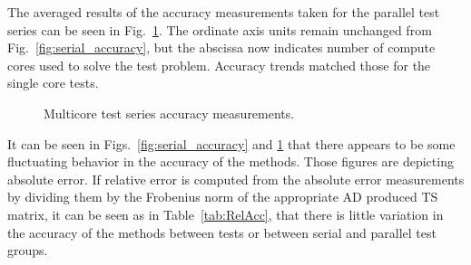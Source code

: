 \documentclass[preprint,12pt]{elsarticle}
\begin{document}
%
The averaged results of the accuracy measurements taken for the parallel test
series can be seen in Fig.~\ref{fig:multi_accuracy}. The ordinate axis units
remain unchanged from Fig.~\ref{fig:serial_accuracy}, but the abscissa now
indicates number of compute cores used to solve the test problem. Accuracy
trends matched those for the single core tests. 
%
\begin{figure}[tbp] \centering
\scalebox{1.0}{} \caption{Multicore test
series accuracy measurements.} \label{fig:multi_accuracy} \end{figure}
%
 It can be seen in Figs.~\ref{fig:serial_accuracy} and \ref{fig:multi_accuracy} that there appears to be some fluctuating behavior in the accuracy of the methods. Those figures are depicting absolute error. If relative error is computed from the absolute error measurements by dividing them by the Frobenius norm of the appropriate AD produced TS matrix, it can be seen as in Table~\ref{tab:RelAcc}, that there is little variation in the accuracy of the methods between tests or between serial and parallel test groups. 
\end{document}
